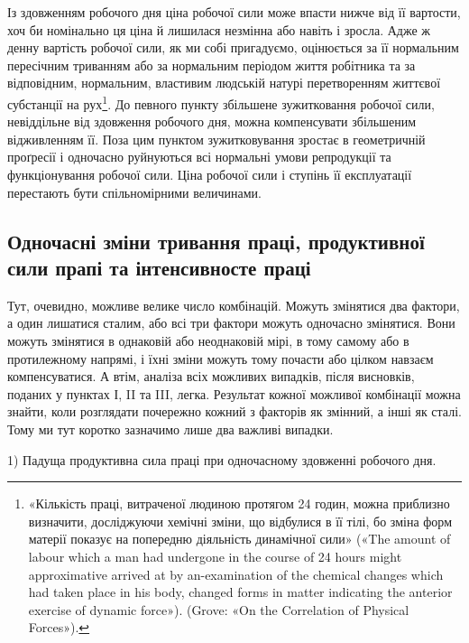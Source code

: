 Із здовженням робочого дня ціна робочої сили може впасти
нижче від її вартости, хоч би номінально ця ціна й лишилася
незмінна або навіть і зросла. Адже ж денну вартість робочої сили,
як ми собі пригадуємо, оцінюється за її нормальним пересічним
триванням або за нормальним періодом життя робітника та за
відповідним, нормальним, властивим людській натурі перетворенням
життєвої субстанції на рух\footnote{
«Кількість праці, витраченої людиною протягом 24 годин, можна
приблизно визначити, досліджуючи хемічні зміни, що відбулися в її
тілі, бо зміна форм матерії показує на попередню діяльність динамічної
сили» («The amount of labour which a man had undergone in the course
of 24 hours might approximative arrived at by an-examination of the
chemical changes which had taken place in his body, changed forms in
matter indicating the anterior exercise of dynamic force»). (Grove: «On
the Correlation of Physical Forces»).
}. До певного пункту збільшене
зужитковання робочої сили, невіддільне від здовження
робочого дня, можна компенсувати збільшеним відживленням її.
Поза цим пунктом зужитковування зростає в геометричній проґресії
і одночасно руйнуються всі нормальні умови репродукції
та функціонування робочої сили. Ціна робочої сили і ступінь
її експлуатації перестають бути спільномірними величинами.

\subsection{Одночасні зміни тривання праці, продуктивної сили прапі
та інтенсивносте праці}

Тут, очевидно, можливе велике число комбінацій. Можуть
змінятися два фактори, а один лишатися сталим, або всі три фактори
можуть одночасно змінятися. Вони можуть змінятися в
однаковій або неоднаковій мірі, в тому самому або в протилежному
напрямі, і їхні зміни можуть тому почасти або цілком
навзаєм компенсуватися. А втім, аналіза всіх можливих випадків,
після висновків, поданих у пунктах І, II та III, легка. Результат
кожної можливої комбінації можна знайти, коли розглядати
почережно кожний з факторів як змінний, а інші як сталі.
Тому ми тут коротко зазначимо лише два важливі випадки.

1) Падуща продуктивна сила праці при одночасному здовженні
робочого дня.

